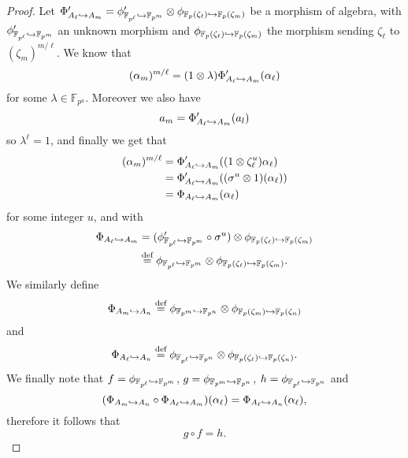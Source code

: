 \documentclass[a4paper,11pt]{article}
\begin{document}
\begin{proof}
  Let $\Phi_{A_\ell\hookrightarrow A_m}' =
\phi_{\mathbb{F}_{p^\ell}\hookrightarrow\mathbb{F}_{p^m}}'\otimes\phi_{\mathbb{F}_{p}(\zeta_\ell)\hookrightarrow\mathbb{F}_{p}(\zeta_m)}$
be a morphism of algebra, with $\phi_{\mathbb{F}_{p^\ell}\hookrightarrow\mathbb{F}_{p^m}}'$
an unknown morphism and 
$\phi_{\mathbb{F}_{p}(\zeta_\ell)\hookrightarrow\mathbb{F}_{p}(\zeta_m)}$ the morphism
sending $\zeta_\ell$ to $(\zeta_m)^{m/\ell}$. We know that
\[
  (\alpha_m)^{m/\ell} = (1\otimes\lambda)\Phi_{A_\ell\hookrightarrow A_m}'(\alpha_\ell) 
\]
for some $\lambda\in\mathbb{F}_{p^a}$. Moreover we also have 
\[
  a_m = \Phi_{A_\ell\hookrightarrow A_m}'(a_l)
\]
so $\lambda^\ell = 1$, and finally we get that
\begin{align*}
  (\alpha_m)^{m/\ell} &= \Phi_{A_\ell\hookrightarrow
  A_m}'((1\otimes\zeta_\ell^u)\alpha_\ell) \\
  &= \Phi_{A_\ell\hookrightarrow
  A_m}'((\sigma^u\otimes 1)(\alpha_\ell)) \\
  &= \Phi_{A_\ell\hookrightarrow A_m}(\alpha_\ell)
\end{align*}
for some integer $u$, and with
\begin{align*}
 \Phi_{A_\ell\hookrightarrow A_m} &=
(\phi_{\mathbb{F}_{p^\ell}\hookrightarrow\mathbb{F}_{p^m}}'\circ\sigma^u)\otimes\phi_{\mathbb{F}_{p}(\zeta_\ell)\hookrightarrow\mathbb{F}_{p}(\zeta_m)}\\
&\overset{\text{def}}{=}
\phi_{\mathbb{F}_{p^\ell}\hookrightarrow\mathbb{F}_{p^m}}\otimes\phi_{\mathbb{F}_{p}(\zeta_\ell)\hookrightarrow\mathbb{F}_{p}(\zeta_m)}.
\end{align*}
We similarly define 
\[
  \Phi_{A_m\hookrightarrow
  A_n}\overset{\text{def}}{=}\phi_{\mathbb{F}_{p^m}\hookrightarrow\mathbb{F}_{p^n}}\otimes\phi_{\mathbb{F}_{p}(\zeta_m)\hookrightarrow\mathbb{F}_{p}(\zeta_n)}
\]
and
\[
  \Phi_{A_\ell\hookrightarrow
  A_n}\overset{\text{def}}{=}\phi_{\mathbb{F}_{p^\ell}\hookrightarrow\mathbb{F}_{p^n}}\otimes\phi_{\mathbb{F}_{p}(\zeta_\ell)\hookrightarrow\mathbb{F}_{p}(\zeta_n)}.
\]
We finally note that $f = \phi_{\mathbb{F}_{p^\ell}\hookrightarrow\mathbb{F}_{p^m}}$, 
$g = \phi_{\mathbb{F}_{p^m}\hookrightarrow\mathbb{F}_{p^n}}$, 
$h = \phi_{\mathbb{F}_{p^\ell}\hookrightarrow\mathbb{F}_{p^n}}$ and
\[
(\Phi_{A_m\hookrightarrow A_n}\circ\Phi_{A_\ell\hookrightarrow A_m})(\alpha_\ell) = \Phi_{A_\ell\hookrightarrow
A_n}(\alpha_\ell),
\]
therefore it follows that
\[
  g\circ f = h.
\]
\end{proof}
\end{document}
